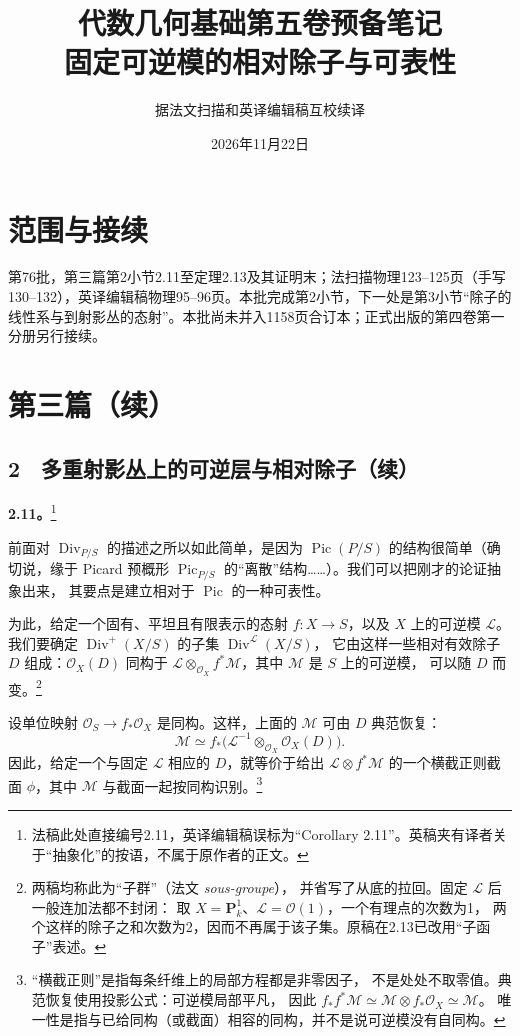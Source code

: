 \documentclass[openany,fontset=fandol]{ctexbook}
\newcommand{\OO}{\mathcal O}
\newcommand{\LL}{\mathcal L}
\newcommand{\MM}{\mathcal M}
\newcommand{\Div}{\operatorname{Div}}
\newcommand{\Pic}{\operatorname{Pic}}
\newcommand{\PP}{\mathbf P}
\begin{document}
\title{代数几何基础第五卷预备笔记\\固定可逆模的相对除子与可表性}
\author{据法文扫描和英译编辑稿互校续译}
\date{2026年11月22日}
\maketitle
\chapter*{范围与接续}
第76批，第三篇第2小节2.11至定理2.13及其证明末；法扫描物理123--125页（手写130--132），英译编辑稿物理95--96页。本批完成第2小节，下一处是第3小节“除子的线性系与到射影丛的态射”。本批尚未并入1158页合订本；正式出版的第四卷第一分册另行接续。
\chapter*{第三篇（续）}
\section*{2　多重射影丛上的可逆层与相对除子（续）}
\noindent\textbf{2.11。}\footnote{法稿此处直接编号2.11，英译编辑稿误标为“Corollary 2.11”。英稿夹有译者关于“抽象化”的按语，不属于原作者的正文。}

前面对 \(\Div_{P/S}\) 的描述之所以如此简单，是因为
\(\Pic(P/S)\) 的结构很简单（确切说，缘于 Picard 预概形
\(\Pic_{P/S}\) 的“离散”结构……）。我们可以把刚才的论证抽象出来，
其要点是建立相对于 \(\Pic\) 的一种可表性。

为此，给定一个固有、平坦且有限表示的态射 \(f:X\to S\)，以及 \(X\) 上的可逆模 \(\LL\)。
我们要确定 \(\Div^+(X/S)\) 的子集 \(\Div^{\LL}(X/S)\)，
它由这样一些相对有效除子 \(D\) 组成：\(\OO_X(D)\) 同构于
\(\LL\otimes_{\OO_X} f^*\MM\)，其中 \(\MM\) 是 \(S\) 上的可逆模，
可以随 \(D\) 而变。\footnote{两稿均称此为“子群”（法文 \emph{sous-groupe}），
并省写了从底的拉回。固定 \(\LL\) 后一般连加法都不封闭：
取 \(X=\PP^1_k\)、\(\LL=\OO(1)\)，一个有理点的次数为1，
两个这样的除子之和次数为2，因而不再属于该子集。原稿在2.13已改用“子函子”表述。}

设单位映射 \(\OO_S\to f_*\OO_X\) 是同构。这样，上面的
\(\MM\) 可由 \(D\) 典范恢复：
\[
 \MM\simeq f_*\bigl(\LL^{-1}\otimes_{\OO_X}\OO_X(D)\bigr).
\]
因此，给定一个与固定 \(\LL\) 相应的 \(D\)，就等价于给出
\(\LL\otimes f^*\MM\) 的一个横截正则截面 \(\phi\)，其中
\(\MM\) 与截面一起按同构识别。\footnote{“横截正则”是指每条纤维上的局部方程都是非零因子，
不是处处不取零值。典范恢复使用投影公式：可逆模局部平凡，
因此 \(f_*f^*\MM\simeq\MM\otimes f_*\OO_X\simeq\MM\)。
唯一性是指与已给同构（或截面）相容的同构，并不是说可逆模没有自同构。}
\end{document}
